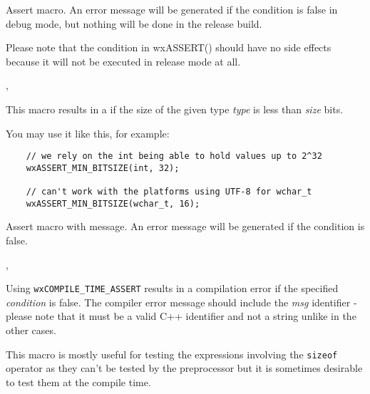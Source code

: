Assert macro. An error message will be generated if the condition is false in
debug mode, but nothing will be done in the release build.

Please note that the condition in wxASSERT() should have no side effects
because it will not be executed in release mode at all.


,\\


\label{wxassertminbitsize}


This macro results in a
 if the size
of the given type {\it type} is less than {\it size} bits.

You may use it like this, for example:

\begin{verbatim}
    // we rely on the int being able to hold values up to 2^32
    wxASSERT_MIN_BITSIZE(int, 32);

    // can't work with the platforms using UTF-8 for wchar_t
    wxASSERT_MIN_BITSIZE(wchar_t, 16);
\end{verbatim}


\label{wxassertmsg}


Assert macro with message. An error message will be generated if the condition is false.


,\\


\label{wxcompiletimeassert}


Using {\tt wxCOMPILE\_TIME\_ASSERT} results in a compilation error if the
specified {\it condition} is false. The compiler error message should include
the {\it msg} identifier - please note that it must be a valid C++ identifier
and not a string unlike in the other cases.

This macro is mostly useful for testing the expressions involving the
{\tt sizeof} operator as they can't be tested by the preprocessor but it is
sometimes desirable to test them at the compile time.

